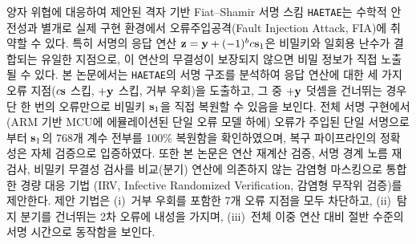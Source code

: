 양자 위협에 대응하여 제안된 격자 기반 Fiat--Shamir 서명 스킴 \texttt{HAETAE}는 수학적 안전성과
별개로 실제 구현 환경에서 오류주입공격(Fault Injection Attack, FIA)에 취약할 수 있다. 특히 서명의
응답 연산 $\mathbf{z}=\mathbf{y}+(-1)^b c\mathbf{s}_1$은 비밀키와 일회용 난수가 결합되는 유일한 지점으로,
이 연산의 무결성이 보장되지 않으면 비밀 정보가 직접 노출될 수 있다. 본 논문에서는 \texttt{HAETAE}의
서명 구조를 분석하여 응답 연산에 대한 세 가지 오류 지점($c\mathbf{s}$ 스킵, $+\mathbf{y}$ 스킵, 거부 우회)을
도출하고, 그 중 $+\mathbf{y}$ 덧셈을 건너뛰는 경우 단 한 번의 오류만으로 비밀키 $\mathbf{s}_1$을 직접
복원할 수 있음을 보인다. 전체 서명 구현에서
(ARM 기반 MCU에 에뮬레이션된 단일 오류 모델 하에) 오류가 주입된 단일 서명으로부터 $\mathbf{s}_1$의 768개 계수 전부를
100\% 복원함을 확인하였으며, 복구 파이프라인의 정확성은 자체 검증으로 입증하였다. 또한 본
논문은 연산 재계산 검증, 서명 경계 노름 재검사, 비밀키 무결성 검사를
비교(분기) 연산에 의존하지 않는 감염형 마스킹으로 통합한 경량 대응 기법
(IRV, Infective Randomized Verification, 감염형 무작위 검증)를
제안한다. 제안 기법은 (i)~거부 우회를 포함한 7개 오류 지점을 모두 차단하고, (ii)~탐지 분기를
건너뛰는 2차 오류에 내성을 가지며, (iii)~전체 이중 연산 대비 절반 수준의 서명 시간으로
동작함을 보인다.
